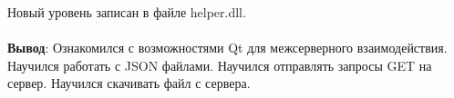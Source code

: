 Новый уровень записан в файле helper.dll.





\paragraph{} \hspace{0pt}

\textbf{Вывод}: Ознакомился с возможностями Qt для межсерверного взаимодействия.
Научился работать с JSON файлами.
Научился отправлять запросы GET на сервер.
Научился скачивать файл с сервера.
